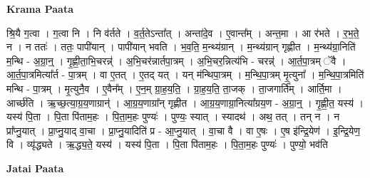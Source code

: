\documentclass[17pt]{extarticle}
\begin{document}
\textbf{Krama Paata} \newline

श्रि॒यै ग॒त्वा । ग॒त्वा नि । नि व॑र्तते । व॒र्त॒तेऽन्ता᳚त् । अन्ता॑दे॒व । ए॒वान्त᳚म् । अन्त॒मा । आ र॑भते । र॒भ॒ते॒ न । न ततः॑ । ततः॒ पापी॑यान् । पापी॑यान् भवति । भ॒व॒ति॒ म॒न्थ्य॑ग्रान् । म॒न्थ्य॑ग्रान् गृह्णीत । म॒न्थ्य॑ग्रा॒निति॑ म॒न्थि - अ॒ग्रा॒न्॒ । गृ॒ह्णी॒ता॒भि॒चरन्न्॑ । अ॒भि॒चर॑न्नार्तपा॒त्रम् । अ॒भि॒चर॒न्नित्य॑भि - चरन्न्॑ । आ॒र्त॒पा॒त्रम् ॅवै । आ॒र्त॒पा॒त्रमित्या᳚र्त - पा॒त्रम् । वा ए॒तत् । ए॒तद् यत् । यन् म॑न्थिपा॒त्रम् । म॒न्थि॒पा॒त्रम् मृ॒त्युना᳚ । म॒न्थि॒पा॒त्रमिति॑ मन्थि - पा॒त्रम् । मृ॒त्युनै॒व । ए॒वैन᳚म् । ए॒न॒म् ग्रा॒ह॒य॒ति॒ । ग्रा॒ह॒य॒ति॒ ता॒जक् । ता॒जगार्ति᳚म् । आर्ति॒मा । आर्च्छ॑ति । ऋ॒च्छ॒त्या॒ग्र॒य॒णाग्रान्॑ । आ॒ग्र॒य॒णाग्रा᳚न् गृह्णीत । आ॒ग्र॒य॒णाग्रा॒नित्या᳚ग्रय॒ण - अ॒ग्रा॒न्॒ । गृ॒ह्णी॒त॒ यस्य॑ । यस्य॑ पि॒ता । पि॒ता पि॑ताम॒हः । पि॒ता॒म॒हः पुण्यः॑ । पुण्यः॒ स्यात् । स्यादथ॑ । अथ॒ तत् । तन् न । न प्रा᳚प्नु॒यात् । प्रा॒प्नु॒याद् वा॒चा । प्रा॒प्नु॒यादिति॑ प्र - आ॒प्नु॒यात् । वा॒चा वै । वा ए॒षः । ए॒ष इ॑न्द्रि॒येण॑ । इ॒न्द्रि॒येण॒ वि । व्यृ॑द्ध्यते । ऋ॒द्ध्य॒ते॒ यस्य॑ । यस्य॑ पि॒ता । पि॒ता पि॑ताम॒हः । पि॒ता॒म॒हः पुण्यः॑ । पुण्यो॒ भव॑ति \newline

\textbf{Jatai Paata} \newline
\end{document}
